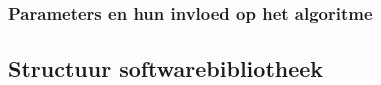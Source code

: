 

\subsubsection{Parameters en hun invloed op het algoritme}


\subsection{Structuur softwarebibliotheek}


